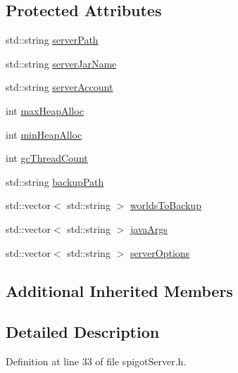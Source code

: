 \subsection*{Protected Attributes}
\begin{DoxyCompactItemize}
\item 
std\+::string \hyperlink{class_minecraft_server_service_1_1_spigot_server_a76f6b550b7fe37a3182e9bc72087a5dc}{server\+Path}
\item 
std\+::string \hyperlink{class_minecraft_server_service_1_1_spigot_server_a603128a2f6ce44b71ee74b601f1a24e0}{server\+Jar\+Name}
\item 
std\+::string \hyperlink{class_minecraft_server_service_1_1_spigot_server_a7d824cedf0faf1a5dcc6e4ab54d9443b}{server\+Account}
\item 
int \hyperlink{class_minecraft_server_service_1_1_spigot_server_ad1d3f0158a2e3f2dd338837bccf25c6a}{max\+Heap\+Alloc}
\item 
int \hyperlink{class_minecraft_server_service_1_1_spigot_server_a4ef50266a24dccd4f0d61d877567b55d}{min\+Heap\+Alloc}
\item 
int \hyperlink{class_minecraft_server_service_1_1_spigot_server_a057e5d3f9de3877edc7de6f3e5c40a6c}{gc\+Thread\+Count}
\item 
std\+::string \hyperlink{class_minecraft_server_service_1_1_spigot_server_a833bf01d9d4a495eda1a8052fdb8ee08}{backup\+Path}
\item 
std\+::vector$<$ std\+::string $>$ \hyperlink{class_minecraft_server_service_1_1_spigot_server_a4596e7ae4d2e1a7d2325fb13434f122a}{worlds\+To\+Backup}
\item 
std\+::vector$<$ std\+::string $>$ \hyperlink{class_minecraft_server_service_1_1_spigot_server_a3175de67475bf37b44a80575d4b3edfe}{java\+Args}
\item 
std\+::vector$<$ std\+::string $>$ \hyperlink{class_minecraft_server_service_1_1_spigot_server_a7a42f5a55caa07437cf121c2dfda60a0}{server\+Options}
\end{DoxyCompactItemize}
\subsection*{Additional Inherited Members}


\subsection{Detailed Description}


Definition at line 33 of file spigot\+Server.\+h.



